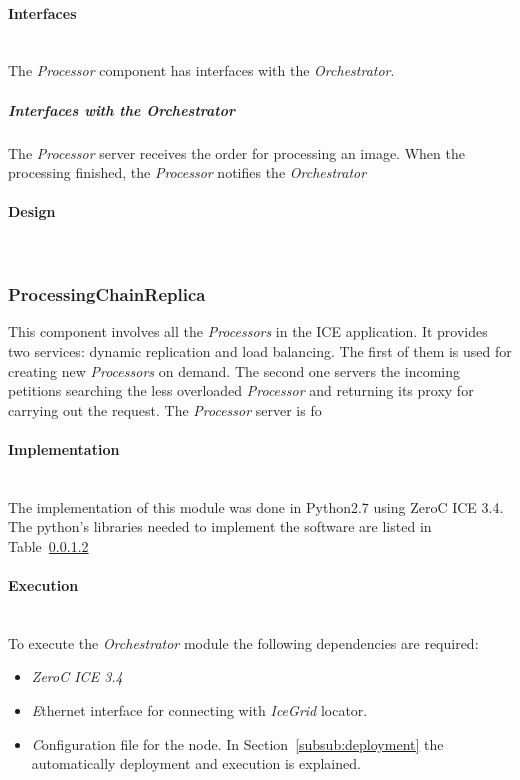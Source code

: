 \paragraph{Interfaces}~\\

The \emph{Processor} component has interfaces with the \emph{Orchestrator}.

\subparagraph{Interfaces with the Orchestrator}

The \emph{Processor} server receives the order for processing an image. When the
processing finished, the \emph{Processor} notifies the \emph{Orchestrator} 

\paragraph{Design}~\\


\subsubsection{ProcessingChainReplica}

This component involves all the \emph{Processors} in the ICE application. It
provides two services: dynamic replication and load balancing. The first
of them is used for creating new \emph{Processors} on demand. The second one 
servers the incoming petitions searching the less overloaded \emph{Processor}
and returning its proxy for carrying out the request.
The \emph{Processor} server is fo

\paragraph{Implementation}~\\

The implementation of this module was done in Python2.7 using ZeroC ICE 3.4. The
python's libraries needed to implement the software are listed in
Table~\ref{}

\paragraph{Execution}~\\

To execute the \emph{Orchestrator} module the following dependencies
are required:
\begin{itemize}
\item \emph{ZeroC ICE 3.4}
\item \emph Ethernet interface for connecting with \emph{IceGrid} locator.
\item \emph Configuration file for the node. In Section~\ref{subsub:deployment} the
  automatically deployment and execution is explained. 
\end{itemize}




